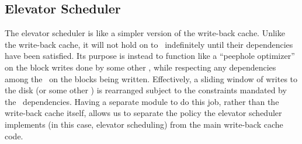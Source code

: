 \subsection{Elevator Scheduler}
\label{sec:modules:elevator}


The elevator scheduler is like a simpler version of the write-back cache. Unlike
the write-back cache, it will not hold on to \chdescs\ indefinitely until their
dependencies have been satisfied. Its purpose is instead to function like a
``peephole optimizer'' on the block writes done by some other \module, while
respecting any dependencies among the \chdescs\ on the blocks being written.
Effectively, a sliding window of writes to the disk (or some other \module) is
rearranged subject to the constraints mandated by the \chdesc\ dependencies.
Having a separate module to do this job, rather than the write-back cache
itself, allows us to separate the policy the elevator scheduler implements (in
this case, elevator scheduling) from the main write-back cache code.

